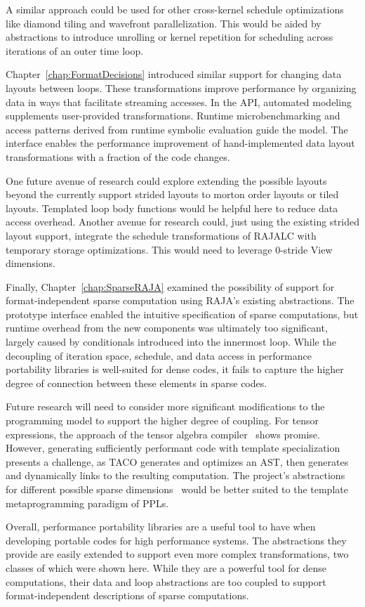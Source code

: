 A similar approach could be used for other cross-kernel schedule optimizations like diamond tiling and wavefront parallelization. 
This would be aided by abstractions to introduce unrolling or kernel repetition for scheduling across iterations of an outer time loop.

Chapter~\ref{chap:FormatDecisions} introduced similar support for changing data layouts between loops.
These transformations improve performance by organizing data in ways that facilitate streaming accesses.
In the \FormatDecisions{} API, automated modeling supplements user-provided transformations.
Runtime microbenchmarking and access patterns derived from runtime symbolic evaluation guide the model.
The interface enables the performance improvement of hand-implemented data layout transformations with a fraction of the code changes.

One future avenue of research could explore extending the possible layouts beyond the currently support strided layouts to morton order layouts or tiled layouts.
Templated loop body functions would be helpful here to reduce data access overhead.
Another avenue for research could, just using the existing strided layout support, integrate the schedule transformations of RAJALC with temporary storage optimizations.
This would need to leverage 0-stride View dimensions.

Finally, Chapter~\ref{chap:SparseRAJA} examined the possibility of support for format-independent sparse computation using RAJA's existing abstractions.
The prototype interface enabled the intuitive specification of sparse computations, but runtime overhead from the new components was ultimately too significant, largely caused by conditionals introduced into the innermost loop.
While the decoupling of iteration space, schedule, and data access in performance portability libraries is well-suited for dense codes, it fails to capture the higher degree of connection between these elements in sparse codes.

Future research will need to consider more significant modifications to the programming model to support the higher degree of coupling.
For tensor expressions, the approach of the tensor algebra compiler~\cite{kjolstad2017tensor} shows promise.
However, generating sufficiently performant code with template specialization presents a challenge, as TACO generates and optimizes an AST, then generates and dynamically links to the resulting computation.
The project's abstractions for different possible sparse dimensions~\cite{chou2018format} would be better suited to the template metaprogramming paradigm of PPLs.

Overall, performance portability libraries are a useful tool to have when developing portable codes for high performance systems.
The abstractions they provide are easily extended to support even more complex transformations, two classes of which were shown here.
While they are a powerful tool for dense computations, their data and loop abstractions are too coupled to support format-independent descriptions of sparse computations.


